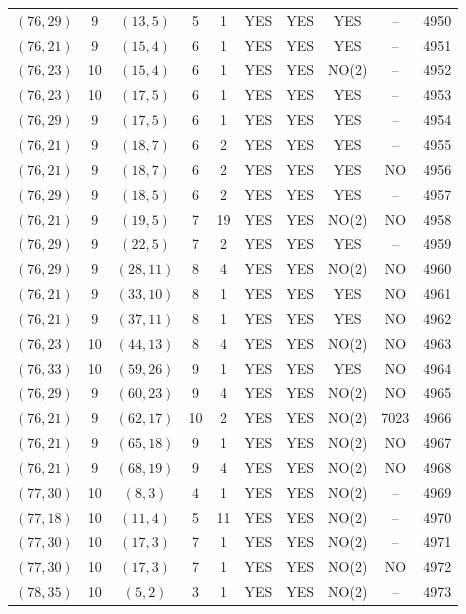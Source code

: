 \begin{longtable}{|c|c|c|c|c|c|c|c|c|c|}
$(76, 29)$ & 9 & $(13, 5)$ & 5 & 1 & YES & YES & YES & -- & 4950\\
$(76, 21)$ & 9 & $(15, 4)$ & 6 & 1 & YES & YES & YES & -- & 4951\\
$(76, 23)$ & 10 & $(15, 4)$ & 6 & 1 & YES & YES & NO(2) & -- & 4952\\
$(76, 23)$ & 10 & $(17, 5)$ & 6 & 1 & YES & YES & YES & -- & 4953\\
$(76, 29)$ & 9 & $(17, 5)$ & 6 & 1 & YES & YES & YES & -- & 4954\\
$(76, 21)$ & 9 & $(18, 7)$ & 6 & 2 & YES & YES & YES & -- & 4955\\
$(76, 21)$ & 9 & $(18, 7)$ & 6 & 2 & YES & YES & YES & NO & 4956\\
$(76, 29)$ & 9 & $(18, 5)$ & 6 & 2 & YES & YES & YES & -- & 4957\\
$(76, 21)$ & 9 & $(19, 5)$ & 7 & 19 & YES & YES & NO(2) & NO & 4958\\
$(76, 29)$ & 9 & $(22, 5)$ & 7 & 2 & YES & YES & YES & -- & 4959\\
$(76, 29)$ & 9 & $(28, 11)$ & 8 & 4 & YES & YES & NO(2) & NO & 4960\\
$(76, 21)$ & 9 & $(33, 10)$ & 8 & 1 & YES & YES & YES & NO & 4961\\
$(76, 21)$ & 9 & $(37, 11)$ & 8 & 1 & YES & YES & YES & NO & 4962\\
$(76, 23)$ & 10 & $(44, 13)$ & 8 & 4 & YES & YES & NO(2) & NO & 4963\\
$(76, 33)$ & 10 & $(59, 26)$ & 9 & 1 & YES & YES & YES & NO & 4964\\
$(76, 29)$ & 9 & $(60, 23)$ & 9 & 4 & YES & YES & NO(2) & NO & 4965\\
$(76, 21)$ & 9 & $(62, 17)$ & 10 & 2 & YES & YES & NO(2) & 7023 & 4966\\
$(76, 21)$ & 9 & $(65, 18)$ & 9 & 1 & YES & YES & NO(2) & NO & 4967\\
$(76, 21)$ & 9 & $(68, 19)$ & 9 & 4 & YES & YES & NO(2) & NO & 4968\\
$(77, 30)$ & 10 & $(8, 3)$ & 4 & 1 & YES & YES & NO(2) & -- & 4969\\
$(77, 18)$ & 10 & $(11, 4)$ & 5 & 11 & YES & YES & NO(2) & -- & 4970\\
$(77, 30)$ & 10 & $(17, 3)$ & 7 & 1 & YES & YES & NO(2) & -- & 4971\\
$(77, 30)$ & 10 & $(17, 3)$ & 7 & 1 & YES & YES & NO(2) & NO & 4972\\
$(78, 35)$ & 10 & $(5, 2)$ & 3 & 1 & YES & YES & NO(2) & -- & 4973\\

\end{longtable}
